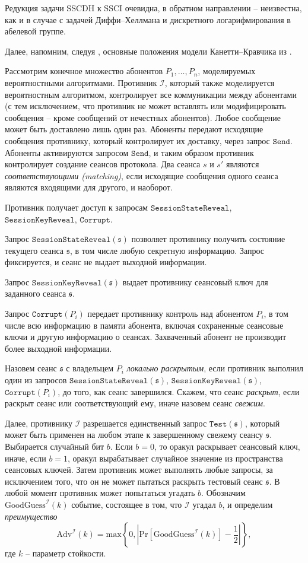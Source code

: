 \documentclass[a4paper,12pt]{article}
\theoremstyle{definition}
\begin{document}
Редукция задачи SSCDH к SSCI очевидна, в обратном направлении -- неизвестна, как и в случае с задачей Диффи--Хеллмана и дискретного логарифмирования в абелевой группе.

Далее, напомним, следуя \cite{DF}, основные положения модели Канетти--Кравчика из \cite{CK}.

Рассмотрим конечное множество абонентов $P_1,\dots,P_n$, моделируемых вероятностными алгоритмами. Противник $\mathcal{I}$, который также моделируется вероятностным алгоритмом,
контролирует все коммуникации между абонентами (с тем исключением, что противник не может вставлять или модифицировать сообщения -- кроме сообщений от нечестных абонентов).
Любое сообщение может быть доставлено лишь один раз. Абоненты передают исходящие сообщения противнику, который контролирует их доставку, через запрос $\mathtt{Send}$. Абоненты
активируются запросом $\mathtt{Send}$, и таким образом противник контролирует создание сеансов протокола. Два сеанса $s$ и $s'$ являются \emph{соответствующими (matching)}, если
исходящие сообщения одного сеанса являются входящими для другого, и наоборот.

Противник получает доступ к запросам $\mathtt{SessionStateReveal}$, $\mathtt{SessionKeyReveal}$, $\mathtt{Corrupt}$. 

Запрос $\mathtt{SessionStateReveal}(\mathfrak{s})$ позволяет противнику получить состояние текущего сеанса $\mathfrak{s}$, в том числе любую секретную информацию. Запрос фиксируется, и сеанс 
не выдает выходной информации.

Запрос  $\mathtt{SessionKeyReveal}(\mathfrak{s})$ выдает противнику сеансовый ключ для заданного сеанса $\mathfrak{s}$.

Запрос $\mathtt{Corrupt}(P_i)$ передает противнику контроль над абонентом $P_i$, в том числе всю информацию в памяти абонента, включая сохраненные сеансовые ключи и другую информацию о сеансах. Захваченный абонент не производит более выходной информации.

Назовем сеанс $\mathfrak{s}$  с владельцем $P_i$ \emph{локально раскрытым}, если противник выполнил один из запросов $\mathtt{SessionStateReveal}(\mathfrak{s})$, $\mathtt{SessionKeyReveal}(\mathfrak{s})$, $\mathtt{Corrupt}(P_i)$, до того, как сеанс завершился. Скажем, что сеанс \emph{раскрыт}, если раскрыт сеанс или соответствующий ему, иначе назовем сеанс \emph{свежим}.

Далее, противнику $\mathcal{I}$ разрешается единственный запрос $\mathtt{Test}(\mathfrak{s})$, который может быть применен на любом этапе к завершенному свежему сеансу $\mathfrak{s}$.
Выбирается случайный бит $b$. Если $b=0$, то оракул раскрывает сеансовый ключ, иначе, если $b=1$, оракул вырабатывает случайное значение из пространства сеансовых ключей. Затем противник может выполнять любые запросы, за исключением того, что он не может пытаться раскрыть тестовый сеанс $\mathfrak{s}$. В любой момент противник может попытаться угадать $b$. Обозначим
$\mathrm{GoodGuess}^{\mathcal{I}}(k)$ событие, состоящее в том, что $\mathcal{I}$ угадал $b$, и определим \emph{преимущество}
$$
\mathrm{Adv}^{\mathcal{I}}(k)=\mathrm{max}\left\{0,\left|\mathrm{Pr}[\mathrm{GoodGuess}^{\mathcal{I}}(k)]-\frac{1}{2}\right|\right\},
$$
где $k$ -- параметр стойкости.
\end{document}
